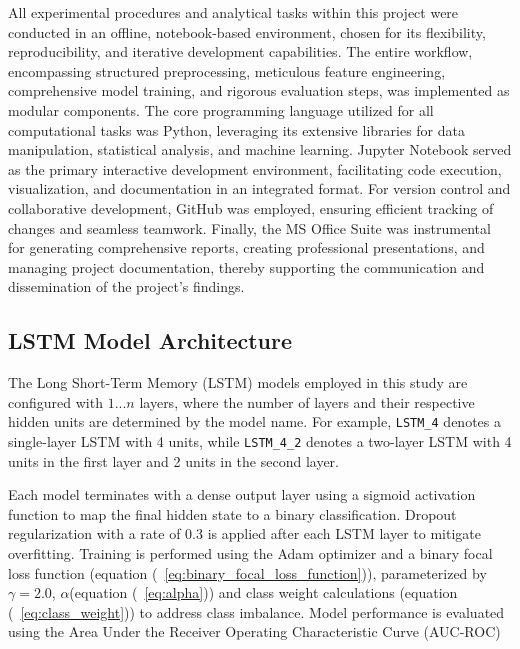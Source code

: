 All experimental procedures and analytical tasks within this project were conducted in an offline, notebook-based environment, chosen for its flexibility, reproducibility, and iterative development capabilities. The entire workflow, encompassing structured preprocessing, meticulous feature engineering, comprehensive model training, and rigorous evaluation steps, was implemented as modular components. The core programming language utilized for all computational tasks was Python, leveraging its extensive libraries for data manipulation, statistical analysis, and machine learning. Jupyter Notebook served as the primary interactive development environment, facilitating code execution, visualization, and documentation in an integrated format. For version control and collaborative development, GitHub was employed, ensuring efficient tracking of changes and seamless teamwork. Finally, the MS Office Suite was instrumental for generating comprehensive reports, creating professional presentations, and managing project documentation, thereby supporting the communication and dissemination of the project's findings.


\subsection{LSTM Model Architecture}

The Long Short-Term Memory (LSTM) models employed in this study are configured with $1...n$ layers, where the number of layers and their respective hidden units are determined by the model name. For example, \texttt{LSTM\_4} denotes a single-layer LSTM with 4 units, while \texttt{LSTM\_4\_2} denotes a two-layer LSTM with 4 units in the first layer and 2 units in the second layer.

Each model terminates with a dense output layer using a sigmoid activation function to map the final hidden state to a binary classification. Dropout regularization with a rate of 0.3 is applied after each LSTM layer to mitigate overfitting. Training is performed using the Adam optimizer and a binary focal loss function (equation (~\ref{eq:binary_focal_loss_function})), parameterized by $\gamma = 2.0$,  $\alpha$(equation (~\ref{eq:alpha})) and class weight calculations (equation (~\ref{eq:class_weight}))  to address class imbalance. 
Model performance is evaluated using the Area Under the Receiver Operating Characteristic Curve (AUC-ROC)


